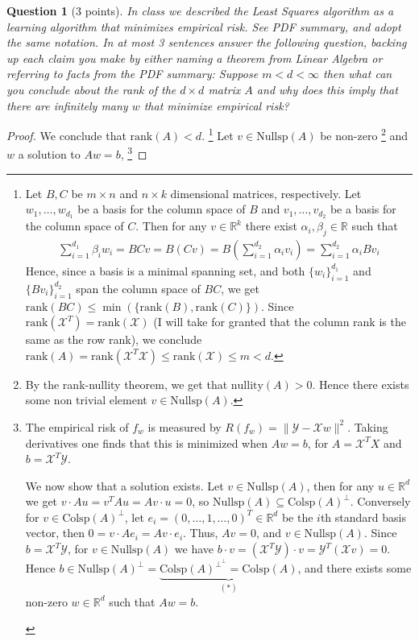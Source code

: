 \documentclass[12pt]{article}
\newcommand{\real}{\mathbb{R}}
\newcommand\set[1]{\{#1\}}
\newcommand\nullity{\text{nullity}}
\newcommand{\norm}[1]{\lVert #1 \rVert}
\newcommand{\X}{\mathcal{X}}
\newcommand{\Y}{\mathcal{Y}}
\newcommand{\colsp}{\text{Colsp}}
\newcommand{\nullsp}{\text{Nullsp}}
\newcommand{\rk}{\text{rank}}
\newtheorem{question}{Question}
\begin{document}
\begin{question}[3 points]
  In class we described the Least Squares algorithm as a learning algorithm that minimizes empirical risk.
  See PDF summary, and adopt the same notation. In at most 3 sentences answer the following question, backing up each claim you make by either naming a theorem from Linear Algebra or referring to facts from the PDF summary: Suppose $m < d < \infty$ then what can you conclude about the rank of the $d \times d$ matrix $A$ and why does this imply that there are infinitely many $w$ that minimize empirical risk? 
\end{question}
\begin{proof}

  We conclude that $\rk(A) < d$.
  \footnote{Let $B, C$ be $m \times n$ and $n \times k$ dimensional matrices, respectively. Let $w_1, \dots, w_{d_1}$ be a basis for the column space of $B$ and $v_1, \dots, v_{d_2}$ be a basis for the column space of $C$. Then for any $v \in \real^k$ there exist $\alpha_i, \beta_j \in \real$ such that
  \begin{align*}
   \sum\limits_{i=1}^{d_1}\beta_iw_i = BCv = B(Cv) =  B(\sum\limits_{i=1}^{d_2}\alpha_iv_i) = \sum\limits_{i=1}^{d_2}\alpha_iBv_i 
  \end{align*}
  Hence, since a basis is a minimal spanning set, and both $\set{w_i}_{i=1}^{d_1}$ and $\set{Bv_i}_{i=1}^{d_2}$  span the column space of $BC$, we get $\rk(BC) \leq \min(\set{\rk(B), \rk(C)})$. Since $\rk(\X^T) = \rk(\X)$ (I will take for granted that the column rank is the same as the row rank), we conclude $\rk(A) = \rk(\X^T\X) \leq \rk(\X) \leq m < d$.
  }
  Let $v \in \nullsp(A)$ be non-zero
  \footnote{
  By the rank-nullity theorem, we get that $\nullity(A)>0$. Hence there exists some non trivial element $ v \in \nullsp(A)$.
  }
  and $w$ a solution to $Aw=b$,
  \footnote{
  The empirical risk of $f_w$ is measured by $R(f_w) = \norm{\Y - \X w}^2$. Taking derivatives one finds that this is minimized when $Aw=b$, for $A=\X^T X$ and $b=\X^T \Y$. \\
  \begin{indent}
    We now show that a solution exists. Let $v \in \nullsp(A)$, then for any $u \in \real^d$ we get $v \cdot Au = v^T A u = Av \cdot u = 0$, so $\nullsp(A) \subseteq \colsp(A)^{\perp}$. Conversely for $v \in \colsp(A)^{\perp}$, let $e_i =(0, \dots, 1, \dots, 0)^T \in \real^d$ be the $i$th standard basis vector, then $0 = v \cdot Ae_i = Av \cdot e_i$. Thus, $Av = 0$, and $v \in \nullsp(A)$. Since $b=\X^T\Y$, for $v \in \nullsp(A)$ we have $b \cdot v = (\X^T \Y) \cdot v = \Y^T (\X v) = 0$. Hence $b \in \nullsp(A)^{\perp} = \underbrace{\colsp(A)^{{\perp}^{\perp}} = \colsp(A)}_{(*)}$, and there exists some non-zero $w \in \real^d$ such that $Aw = b$.

\end{indent}}
\end{proof}
\end{document}
